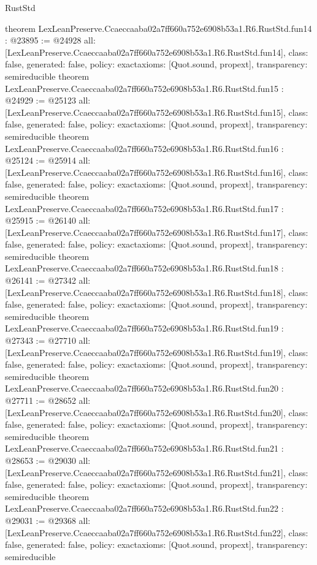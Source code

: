 \begin{lexlean}{RustStd}
\begin{coremodule}
{}
theorem LexLeanPreserve.Ccaeccaaba02a7ff660a752e6908b53a1.R6.RustStd.fun14 : @23895 := @24928 {
  all: [LexLeanPreserve.Ccaeccaaba02a7ff660a752e6908b53a1.R6.RustStd.fun14],
  class: false,
  generated: false,
  policy: exact{axioms: [Quot.sound, propext]},
  transparency: semireducible
}
theorem LexLeanPreserve.Ccaeccaaba02a7ff660a752e6908b53a1.R6.RustStd.fun15 : @24929 := @25123 {
  all: [LexLeanPreserve.Ccaeccaaba02a7ff660a752e6908b53a1.R6.RustStd.fun15],
  class: false,
  generated: false,
  policy: exact{axioms: [Quot.sound, propext]},
  transparency: semireducible
}
theorem LexLeanPreserve.Ccaeccaaba02a7ff660a752e6908b53a1.R6.RustStd.fun16 : @25124 := @25914 {
  all: [LexLeanPreserve.Ccaeccaaba02a7ff660a752e6908b53a1.R6.RustStd.fun16],
  class: false,
  generated: false,
  policy: exact{axioms: [Quot.sound, propext]},
  transparency: semireducible
}
theorem LexLeanPreserve.Ccaeccaaba02a7ff660a752e6908b53a1.R6.RustStd.fun17 : @25915 := @26140 {
  all: [LexLeanPreserve.Ccaeccaaba02a7ff660a752e6908b53a1.R6.RustStd.fun17],
  class: false,
  generated: false,
  policy: exact{axioms: [Quot.sound, propext]},
  transparency: semireducible
}
theorem LexLeanPreserve.Ccaeccaaba02a7ff660a752e6908b53a1.R6.RustStd.fun18 : @26141 := @27342 {
  all: [LexLeanPreserve.Ccaeccaaba02a7ff660a752e6908b53a1.R6.RustStd.fun18],
  class: false,
  generated: false,
  policy: exact{axioms: [Quot.sound, propext]},
  transparency: semireducible
}
theorem LexLeanPreserve.Ccaeccaaba02a7ff660a752e6908b53a1.R6.RustStd.fun19 : @27343 := @27710 {
  all: [LexLeanPreserve.Ccaeccaaba02a7ff660a752e6908b53a1.R6.RustStd.fun19],
  class: false,
  generated: false,
  policy: exact{axioms: [Quot.sound, propext]},
  transparency: semireducible
}
theorem LexLeanPreserve.Ccaeccaaba02a7ff660a752e6908b53a1.R6.RustStd.fun20 : @27711 := @28652 {
  all: [LexLeanPreserve.Ccaeccaaba02a7ff660a752e6908b53a1.R6.RustStd.fun20],
  class: false,
  generated: false,
  policy: exact{axioms: [Quot.sound, propext]},
  transparency: semireducible
}
theorem LexLeanPreserve.Ccaeccaaba02a7ff660a752e6908b53a1.R6.RustStd.fun21 : @28653 := @29030 {
  all: [LexLeanPreserve.Ccaeccaaba02a7ff660a752e6908b53a1.R6.RustStd.fun21],
  class: false,
  generated: false,
  policy: exact{axioms: [Quot.sound, propext]},
  transparency: semireducible
}
theorem LexLeanPreserve.Ccaeccaaba02a7ff660a752e6908b53a1.R6.RustStd.fun22 : @29031 := @29368 {
  all: [LexLeanPreserve.Ccaeccaaba02a7ff660a752e6908b53a1.R6.RustStd.fun22],
  class: false,
  generated: false,
  policy: exact{axioms: [Quot.sound, propext]},
  transparency: semireducible
}
\end{coremodule}
\end{lexlean}
